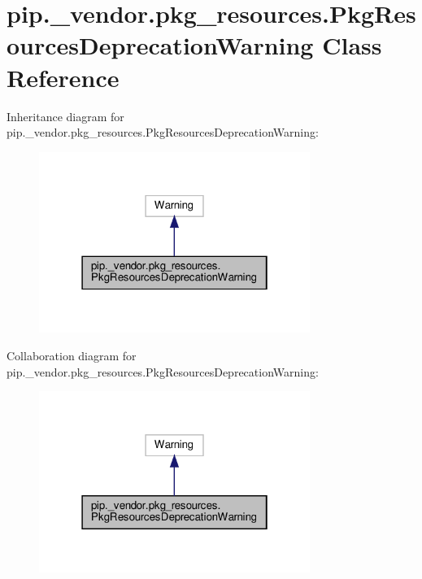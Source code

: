 \hypertarget{classpip_1_1__vendor_1_1pkg__resources_1_1PkgResourcesDeprecationWarning}{}\section{pip.\+\_\+vendor.\+pkg\+\_\+resources.\+Pkg\+Resources\+Deprecation\+Warning Class Reference}
\label{classpip_1_1__vendor_1_1pkg__resources_1_1PkgResourcesDeprecationWarning}


Inheritance diagram for pip.\+\_\+vendor.\+pkg\+\_\+resources.\+Pkg\+Resources\+Deprecation\+Warning\+:
\nopagebreak
\begin{figure}[H]
\begin{center}
\leavevmode
\includegraphics[width=250pt]{classpip_1_1__vendor_1_1pkg__resources_1_1PkgResourcesDeprecationWarning__inherit__graph}
\end{center}
\end{figure}


Collaboration diagram for pip.\+\_\+vendor.\+pkg\+\_\+resources.\+Pkg\+Resources\+Deprecation\+Warning\+:
\nopagebreak
\begin{figure}[H]
\begin{center}
\leavevmode
\includegraphics[width=250pt]{classpip_1_1__vendor_1_1pkg__resources_1_1PkgResourcesDeprecationWarning__coll__graph}
\end{center}
\end{figure}


